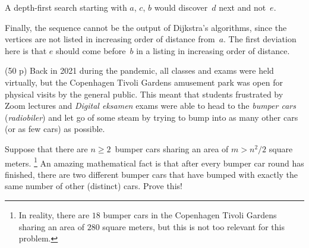 \documentclass{jn-pset}
\begin{document}
\begin{problem}
\begin{solution}
\begin{compactitem}
  \item
    A depth-first search starting with $a$, $c$, $b$ would discover~$d$
    next and not~$e$.
        
  \item
    Finally, the sequence cannot be the output of Dijkstra's    algorithms,
    since the vertices are not listed in increasing order of distance
    from~$a$. The first deviation here is that $e$ should come
    before~$b$ in a listing in increasing order of distance.
    
  \end{compactitem}

  
\end{solution}

      

  
\end{problem}


\begin{problem}
  (50 p)
%     
%   
  Back in 2021 during the pandemic, all classes and exams were held virtually, but
  the Copenhagen Tivoli Gardens amusement park was  open for physical visits by the
  general public. This meant that students frustrated by 
  Zoom lectures and \emph{Digital eksamen} exams 
  were able to head to the \emph{bumper cars}
  (\emph{radiobiler}) and let go of 
  some steam by trying to bump into as many other cars (or as few
  cars) as possible.

  Suppose that there are $n \geq 2$~bumper cars sharing an area of 
  $m > n^2 / 2$ square meters.%
  \footnote{In reality, 
    there are $18$ bumper cars 
    in the Copenhagen Tivoli Gardens
    sharing an area of
    $280$ square meters, but this is not too relevant for this problem.
  }
  An amazing mathematical fact is that after every bumper car round
  has finished, there are two different bumper cars that have bumped
  with exactly the same number of other (distinct) cars.
  Prove this!
\end{problem}
\end{document}
